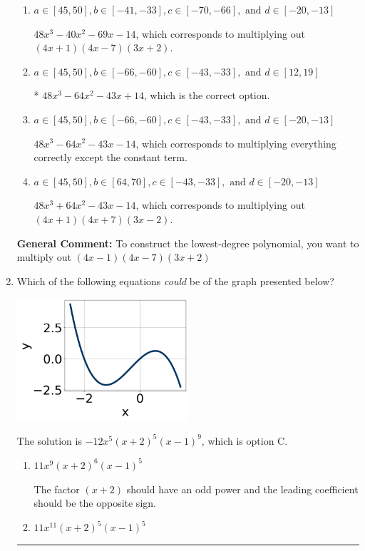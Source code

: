 \documentclass{extbook}[14pt]
\newcommand{\litem}[1]{\item #1

\rule{\textwidth}{0.4pt}}
\begin{document}
\begin{enumerate}
{\begin{enumerate}[label=\Alph*.]
$48x^{3} +128 x^{2} +85 x + 14$, which corresponds to multiplying out $(4x + 1)(4x + 7)(3x + 2)$.
\item \( a \in [45, 50], b \in [-41, -33], c \in [-70, -66], \text{ and } d \in [-20, -13] \)

$48x^{3} -40 x^{2} -69 x -14$, which corresponds to multiplying out $(4x + 1)(4x -7)(3x + 2)$.
\item \( a \in [45, 50], b \in [-66, -60], c \in [-43, -33], \text{ and } d \in [12, 19] \)

* $48x^{3} -64 x^{2} -43 x + 14$, which is the correct option.
\item \( a \in [45, 50], b \in [-66, -60], c \in [-43, -33], \text{ and } d \in [-20, -13] \)

$48x^{3} -64 x^{2} -43 x -14$, which corresponds to multiplying everything correctly except the constant term.
\item \( a \in [45, 50], b \in [64, 70], c \in [-43, -33], \text{ and } d \in [-20, -13] \)

$48x^{3} +64 x^{2} -43 x -14$, which corresponds to multiplying out $(4x + 1)(4x + 7)(3x -2)$.
\end{enumerate}

\textbf{General Comment:} To construct the lowest-degree polynomial, you want to multiply out $(4x -1)(4x -7)(3x + 2)$
}
\litem{
Which of the following equations \textit{could} be of the graph presented below?

\begin{center}
    \includegraphics[width=0.5\textwidth]{../Figures/polyGraphToFunctionC.png}
\end{center}


The solution is \( -12x^{5} (x + 2)^{5} (x - 1)^{9} \), which is option C.\begin{enumerate}[label=\Alph*.]
\item \( 11x^{9} (x + 2)^{6} (x - 1)^{5} \)

The factor $(x + 2)$ should have an odd power and the leading coefficient should be the opposite sign.
\item \( 11x^{11} (x + 2)^{5} (x - 1)^{5} \)


\end{enumerate}}
\end{enumerate}
\end{document}
